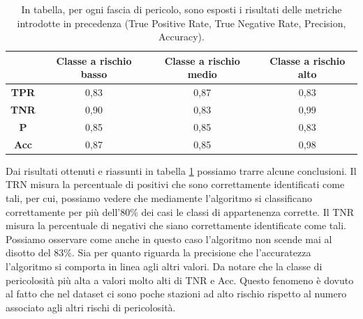 \begin{table}[h]
	\centering
	\renewcommand{\arraystretch}{1.2}
	\begin{tabular}{|c|c|c|c|}
		\hline
		\multicolumn{1}{|l|}{\cellcolor[HTML]{FFFFFF}} & \cellcolor[HTML]{32CB00} Classe a rischio basso & \cellcolor[HTML]{FFFE65} Classe a rischio medio & \cellcolor[HTML]{FE0000}Classe a rischio alto \\ \hline
		\textbf{TPR}                                   & 0,83                                                           & 0,87                                                           & 0,83                                                          \\ \hline
		\textbf{TNR}                                   & 0,90                                                           & 0,83                                                           & 0,99                                                          \\ \hline
		\textbf{P}                                     & 0,85                                                           & 0,85                                                           & 0,83                                                          \\ \hline
		\textbf{Acc}                                   & 0,87                                                           & 0,85                                                           & 0,98                                                          \\ \hline
	\end{tabular}
	\caption{In tabella, per ogni fascia di pericolo, sono esposti i risultati delle metriche introdotte in precedenza (True Positive Rate, True Negative Rate, Precision, Accuracy).}
	\label{tab:RisultatiMetriche}
\end{table}
Dai risultati ottenuti e riassunti in tabella \ref{tab:RisultatiMetriche} possiamo trarre alcune conclusioni.
Il TRN misura la percentuale di positivi che sono correttamente identificati come tali, per cui, possiamo vedere che mediamente l'algoritmo si classificano correttamente per più dell'80\% dei casi le classi di appartenenza corrette.
Il TNR misura la percentuale di negativi che siano correttamente identificate come tali. Possiamo osservare come anche in questo caso l'algoritmo non scende mai al disotto del 83\%. Sia per quanto riguarda la precisione che l'accuratezza l'algoritmo si comporta in linea agli altri valori. Da notare che la classe di pericolosità più alta a valori molto alti di TNR e Acc. Questo fenomeno è dovuto al fatto che nel dataset ci sono poche stazioni ad alto rischio rispetto al numero associato agli altri rischi di pericolosità.  

